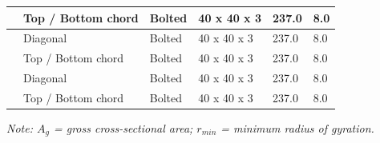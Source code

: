 \documentclass[12pt,a4paper]{report}
\numberwithin{table}{chapter}
\numberwithin{figure}{chapter}
\begin{document}
\begin{longtable}{|C{2.0cm}|L{2.0cm}|L{2.2cm}|C{2.5cm}|C{2.0cm}|C{2.0cm}|}
 & Top / Bottom chord & Bolted & 40 x 40 x 3 & 237.0 & 8.0 \\[6pt]
\hline
{} & Diagonal & Bolted & 40 x 40 x 3 & 237.0 & 8.0 \\[6pt]
 & Top / Bottom chord & Bolted & 40 x 40 x 3 & 237.0 & 8.0 \\[6pt]
\hline
{} & Diagonal & Bolted & 40 x 40 x 3 & 237.0 & 8.0 \\[6pt]
 & Top / Bottom chord & Bolted & 40 x 40 x 3 & 237.0 & 8.0 \\[6pt]
\hline
\end{longtable}
\noindent\textit{Note: $A_g$ = gross cross-sectional area; $r_{min}$ = minimum radius of gyration.}
\end{document}

